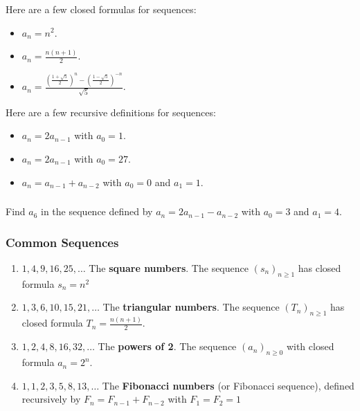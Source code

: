 \documentclass[11pt, compress]{beamer}
\newcommand{\terminology}[1]{\textbf{#1}}
\renewcommand{\d}{\displaystyle}
\begin{document}
\begin{frame}
\frametitle{}
\begin{example}[2.1.2]Here are a few closed formulas for sequences:\begin{itemize}
\item{} \(a_n = n^2\).

\item{} \(\d a_n = \frac{n(n+1)}{2}\).

\item{} \(\d a_n = \frac{\left(\frac{1 + \sqrt 5}{2}\right)^n - \left(\frac{1 - \sqrt 5}{2}\right)^{-n}}{\sqrt{5}}\).
\end{itemize}


\pause \vfill 

Here are a few recursive definitions for sequences:\begin{itemize}
\item{} \(a_n = 2a_{n-1}\) with \(a_0 = 1\).

\item{} \(a_n = 2a_{n-1}\) with \(a_0 = 27\).

\item{} \(a_n = a_{n-1} + a_{n-2}\) with \(a_0 = 0\) and \(a_1 = 1\).
\end{itemize}

\end{example}
\end{frame}
 
\begin{frame}
\frametitle{}
\begin{example}[2.1.3]Find \(a_6\) in the sequence defined by \(a_n = 2a_{n-1} - a_{n-2}\) with \(a_0 = 3\) and \(a_1 = 4\).
\end{example}
\end{frame}
 
\begin{frame}
\frametitle{Common Sequences}
 
\pause 

\begin{enumerate}[<+->]
\item{} \(1, 4, 9, 16, 25, \ldots\)
The \terminology{square numbers}.  The sequence \((s_n)_{n \ge 1}\) has closed formula \(s_n = n^2\)


\item{} \(1, 3, 6, 10, 15, 21, \ldots\)
The \terminology{triangular numbers}.  The sequence \((T_n)_{n \ge 1}\) has closed formula \(T_n = \frac{n(n+1)}{2}\).
\label{g:notation:idm148}

\item{} \(1, 2, 4, 8, 16, 32,\ldots\)
The \terminology{powers of 2}.  The sequence \((a_n)_{n \ge 0}\) with closed formula \(a_n = 2^n\).


\item{} \(1, 1, 2, 3, 5, 8, 13, \ldots\)
The \terminology{Fibonacci numbers} (or Fibonacci sequence), defined recursively by \(F_n = F_{n-1} + F_{n-2}\) with \(F_1 = F_2 = 1\)

\end{enumerate}

\end{frame}
 
\end{document}
